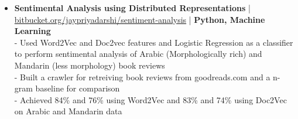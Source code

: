 \begin{itemize}
  \item \textbf{Sentimental Analysis using Distributed Representations} | \href{https://bitbucket.org/jaypriyadarshi/sentiment-analysis}{bitbucket.org/jaypriyadarshi/sentiment-analysis} | \textbf{Python, Machine Learning}\\
 - Used Word2Vec and Doc2vec features and Logistic Regression as a classifier to perform sentimental analysis of Arabic (Morphologically rich) and Mandarin (less morphology) book reviews\\
 - Built a crawler for retreiving book reviews from goodreads.com and a n-gram baseline for comparison\\
 - Achieved 84\% and 76\% using Word2Vec and 83\% and 74\% using Doc2Vec on Arabic and Mandarin data

\end{itemize}
\vspace{5pt}
